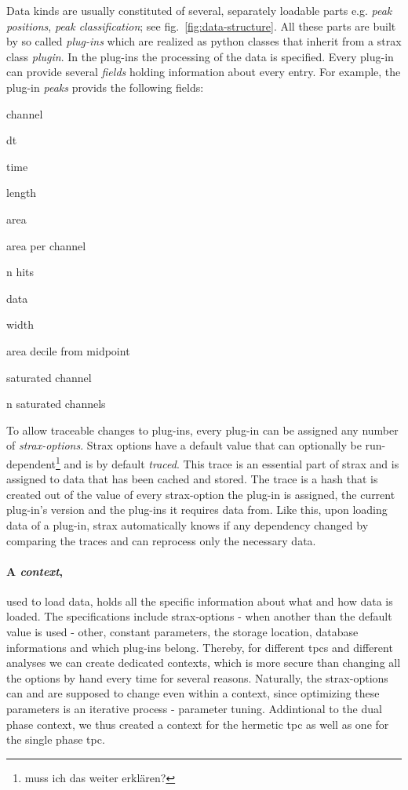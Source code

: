 Data kinds are usually constituted of several, separately loadable parts e.g. \emph{peak positions}, \emph{peak classification}; see fig.~\ref{fig:data-structure}.
All these parts are built by so called \emph{plug-ins} which are realized as python classes that inherit from a strax class \emph{plugin}.
In the plug-ins the processing of the data is specified.
Every plug-in can provide several \emph{fields} holding information about every entry.
For example, the plug-in \emph{peaks} provids the following fields:
\begin{AutoMultiColItemize}
        \item{channel}
        \item{dt}
        \item{time}
        \item{length}
        \item{area}
        \item{area per channel}
        \item{n hits}
        \item{data}
        \item{width}
        \item{area decile from midpoint}
        \item{saturated channel}
        \item{n saturated channels}
\end{AutoMultiColItemize}
To allow traceable changes to plug-ins, every plug-in can be assigned any number of \emph{strax-options}.
Strax options have a default value that can optionally be run-dependent\footnote{muss ich das weiter erklären?} and is by default \emph{traced}.
This trace is an essential part of strax and is assigned to data that has been cached and stored.
The trace is a hash that is created out of the value of every strax-option the plug-in is assigned, the current plug-in's version and the plug-ins it requires data from.
Like this, upon loading data of a plug-in, strax automatically knows if any dependency changed by comparing the traces and can reprocess only the necessary data.

\paragraph{A \emph{context},} used to load data, holds all the specific information about what and how data is loaded.
The specifications include strax-options - when another than the default value is used - other, constant parameters, the storage location, database informations and which plug-ins belong.
Thereby, for different \gls{tpc}s and different analyses we can create dedicated contexts, which is more secure than changing all the options by hand every time for several reasons.
Naturally, the strax-options can and are supposed to change even within a context, since optimizing these parameters is an iterative process - parameter tuning.
Addintional to the dual phase context, we thus created a context for the hermetic \gls{tpc} as well as one for the single phase \gls{tpc}.


